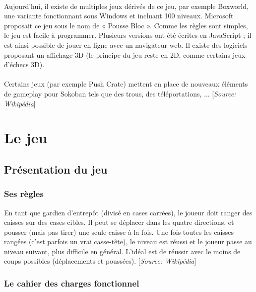 \documentclass[a4paper,12pt]{article} %
\begin{document}
\paragraph{}

	Aujourd'hui, il existe de multiples jeux dérivés de ce jeu, par exemple Boxworld, une variante fonctionnant sous Windows et incluant 100 niveaux. Microsoft proposait ce jeu sous le nom de « Pousse Bloc ». Comme les règles sont simples, le jeu est facile à programmer. Plusieurs versions ont été écrites en JavaScript ; il est ainsi possible de jouer en ligne avec un navigateur web. Il existe des logiciels proposant un affichage 3D (le principe du jeu reste en 2D, comme certains jeux d'échecs 3D).
	
\paragraph{}

	Certains jeux (par exemple Push Crate) mettent en place de nouveaux éléments de gameplay pour Sokoban tels que des trous, des téléportations, ... [\textit{Source: Wikipédia}]

\newpage


\section{Le jeu}

	\subsection{Présentation du jeu}
	
	\subsubsection{Ses règles}
	En tant que gardien d'entrepôt (divisé en cases carrées), le joueur doit ranger des caisses sur des cases cibles. Il peut se déplacer dans les quatre directions, et pousser (mais pas tirer) une seule caisse à la fois. Une fois toutes les caisses rangées (c'est parfois un vrai casse-tête), le niveau est réussi et le joueur passe au niveau suivant, plus difficile en général. L'idéal est de réussir avec le moins de coups possibles (déplacements et poussées). [\textit{Source: Wikipédia}]
	
	\subsubsection{Le cahier des charges fonctionnel}
	
\end{document}
